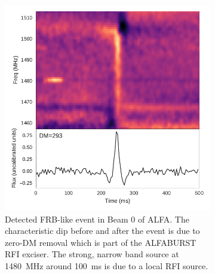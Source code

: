 \documentclass[a4paper,fleqn,usenatbib]{mnras}
\begin{document}
\begin{figure}
    \centering
    \begin{subfigure}[t]{0.45\textwidth}
        \centering\captionsetup{width=.95\linewidth}
        \includegraphics[width=1.0\textwidth]{figures/D20161204_buf23_Beam0.pdf}
        \caption{Detected FRB-like event in Beam 0 of ALFA. The characteristic
        dip before and after the event is due to zero-DM removal which is part
        of the ALFABURST RFI exciser. The strong, narrow band source at 1480~MHz
        around 100~ms is due to a local RFI source.}
        \label{fig:beam0_dynamic_spec}
    \end{subfigure}
    \begin{subfigure}[t]{0.45\textwidth}
        \centering\captionsetup{width=.95\linewidth}

\end{subfigure}
\end{figure}
\end{document}
